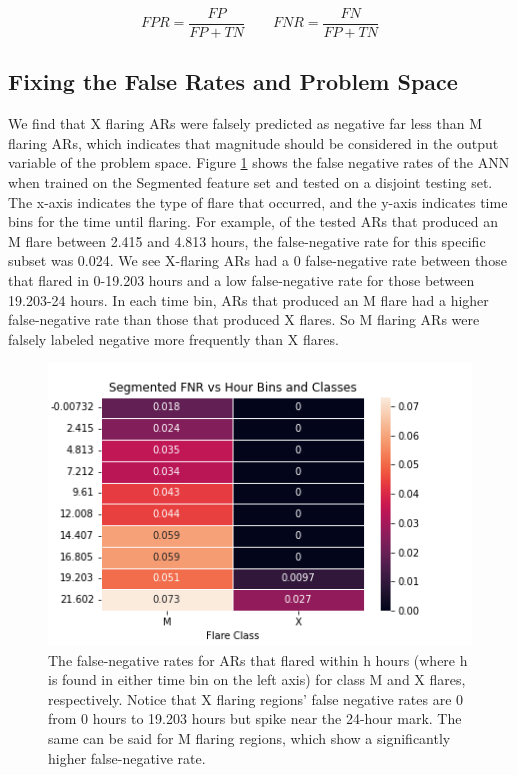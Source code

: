 \documentclass[defaultstyle,11pt]{thesis}
\begin{document}
\begin{equation}
    FPR = \frac{FP}{FP + TN} \qquad FNR = \frac{FN}{FP + TN}
    \label{eq:falserates}
\end{equation}

\subsection{Fixing the False Rates and Problem Space}
We find that X flaring ARs were falsely predicted as negative far less than M flaring ARs, which indicates that magnitude should be considered in the output variable of the problem space. Figure \ref{fig:segfnr} shows the false negative rates of the ANN when trained on the Segmented feature set and tested on a disjoint testing set. The x-axis indicates the type of flare that occurred, and the y-axis indicates time bins for the time until flaring. For example, of the tested ARs that produced an M flare between 2.415 and 4.813 hours, the false-negative rate for this specific subset was 0.024. We see X-flaring ARs had a 0 false-negative rate between those that flared in 0-19.203 hours and a low false-negative rate for those between 19.203-24 hours. In each time bin, ARs that produced an M flare had a higher false-negative rate than those that produced X flares. So M flaring ARs were falsely labeled negative more frequently than X flares.
\begin{figure}[h!]
    \centering
    \includegraphics[width=0.6\linewidth]{ThesisFilePkg/figures/findings/SegmentedFNR.png}
    \caption{The false-negative rates for ARs that flared within h hours (where h is found in either time bin on the left axis) for class M and X flares, respectively. Notice that X flaring regions' false negative rates are 0 from 0 hours to 19.203 hours but spike near the 24-hour mark. The same can be said for M flaring regions, which show a significantly higher false-negative rate.}
    \label{fig:segfnr}
\end{figure}
\end{document}
